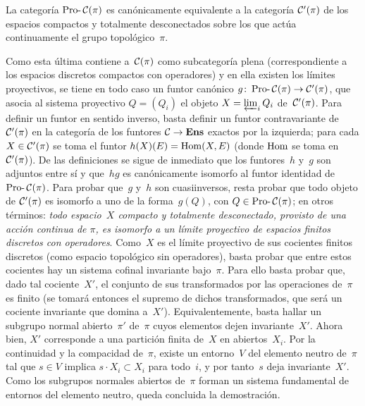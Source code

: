 \begin{proposition}
\label{V.5.2}
La categoría $\Prodash\cal{C}(\pi)$
\label{indnot:ed}%
es canónicamente equivalente a la categoría $\cal{C}'(\pi)$ de los
espacios compactos y totalmente desconectados sobre los que actúa
continuamente el grupo topológico~$\pi$.
\end{proposition}

Como esta última contiene a~$\cal{C}(\pi)$ como subcategoría plena
(correspondiente a los espacios discretos compactos con operadores) y en
ella existen los límites proyectivos, se tiene en todo caso un funtor
canónico $g\colon\Prodash\cal{C}(\pi)\to\cal{C}'(\pi)$, que asocia al
sistema proyectivo $Q=(Q_i)$ el objeto
$X=\varprojlim_iQ_i$ de~$\cal{C}'(\pi)$. Para definir un funtor en sentido
inverso, basta definir un funtor contravariante de~$\cal{C}'(\pi)$ en la
categoría de los funtores $\cal{C}\to\Ens$ exactos por la izquierda; para
cada $X\in\cal{C}'(\pi)$ se toma el funtor $h(X)(E)=\Hom(X,E)$
(donde $\Hom$ se toma en~$\cal{C}'(\pi)$). De las definiciones se sigue de
inmediato que los funtores~$h$ y~$g$ son adjuntos entre sí y que~$hg$ es
canónicamente isomorfo al funtor identidad de~$\Prodash\cal{C}(\pi)$. Para
probar que~$g$ y~$h$ son cuasiinversos, resta probar que todo objeto de
$\cal{C}'(\pi)$ es isomorfo a uno de la forma~$g(Q)$, con
$Q\in\Prodash\cal{C}(\pi)$; en otros términos: \emph{todo espacio~$X$
compacto y totalmente desconectado, provisto de una acción continua de
$\pi$, es isomorfo a un límite proyectivo de espacios finitos discretos con
operadores}. Como~$X$ es el límite proyectivo de sus cocientes finitos
discretos (como espacio topológico sin operadores), basta probar que entre
estos cocientes hay un sistema cofinal invariante bajo~$\pi$. Para ello
basta probar que, dado tal cociente~$X'$, el conjunto de sus transformados
por las operaciones de~$\pi$ es finito (se tomará entonces el supremo de
dichos transformados, que será un cociente invariante que domina a~$X'$).
Equivalentemente, basta hallar un subgrupo normal abierto~$\pi'$ de~$\pi$
cuyos elementos dejen invariante~$X'$. Ahora bien, $X'$ corresponde a una
partición finita de~$X$ en abiertos~$X_i$. Por la continuidad y la
compacidad de~$\pi$, existe un entorno~$V$ del elemento neutro de~$\pi$ tal
que $s\in V$ implica $s\cdot X_i\subset X_i$ para todo~$i$, y por tanto~$s$
deja invariante~$X'$. Como los subgrupos normales abiertos de~$\pi$ forman
un sistema fundamental de entornos del elemento neutro, queda concluida la
demostración.

